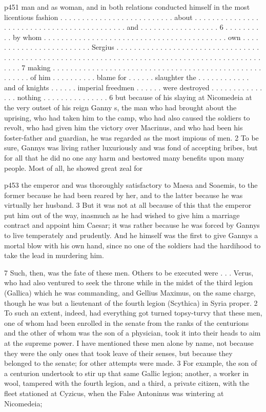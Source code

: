 p451 man and as woman, and in both relations conducted himself in the most licentious fashion . . . . . . . . . . . . . . . . . . . . . . . . . . about . . . . . . . . . . . . . . . . . . . . . . . . . . . . . . . . . . . . . . . . . . . and . . . . . . . . . . . . . . . . . . 6 . . . . . . . . . . by whom . . . . . . . . . . . . . . . . . . . . . . . . . . . . . . . . . . . . . . . . . . own . . . . . . . . . . . . . . . . . . . . . . . . Sergius . . . . . . . . . . . . . . . . . . . . . . . . . . . . . . . . . . . . . . . . . . . . . . . . . . . . . . . . . . . . . . . . . . . . . . . . . . . . . . . . . . . . . . . . . . . . . . . . 7 making . . . . . . . . . . . . . . . . . . . . . . . . . . . . . . . . . . . . . . . . . . . . . . . . . . . . . . of him . . . . . . . . . . blame for . . . . . . slaughter the . . . . . . . . . . . . and of knights . . . . . . imperial freedmen . . . . . . were destroyed . . . . . . . . . . . . . . . nothing . . . . . . . . . . . . . . . 6 but because of his slaying at Nicomedeia at the very outset of his reign Ganny s, the man who had brought about the uprising, who had taken him to the camp, who had also caused the soldiers to revolt, who had given him the victory over Macrinus, and who had been his foster-father and guardian, he was regarded as the most impious of men. 2 To be sure, Gannys was living rather luxuriously and was fond of accepting bribes, but for all that he did no one any harm and bestowed many benefits upon many people. Most of all, he showed great zeal for

p453 the emperor and was thoroughly satisfactory to Maesa and Soaemis, to the former because he had been reared by her, and to the latter because he was virtually her husband. 3 But it was not at all because of this that the emperor put him out of the way, inasmuch as he had wished to give him a marriage contract and appoint him Caesar; it was rather because he was forced by Gannys to live temperately and prudently. And he himself was the first to give Gannys a mortal blow with his own hand, since no one of the soldiers had the hardihood to take the lead in murdering him.

7
Such, then, was the fate of these men. Others to be executed were . . . Verus, who had also ventured to seek the throne while in the midst of the third legion (Gallica) which he was commanding, and Gellius Maximus, on the same charge, though he was but a lieutenant of the fourth legion (Scythica) in Syria proper. 2 To such an extent, indeed, had everything got turned topsy-turvy that these men, one of whom had been enrolled in the senate from the ranks of the centurions and the other of whom was the son of a physician, took it into their heads to aim at the supreme power. I have mentioned these men alone by name, not because they were the only ones that took leave of their senses, but because they belonged to the senate; for other attempts were made. 3 For example, the son of a centurion undertook to stir up that same Gallic legion; another, a worker in wool, tampered with the fourth legion, and a third, a private citizen, with the fleet stationed at Cyzicus, when the False Antoninus was wintering at Nicomedeia;

